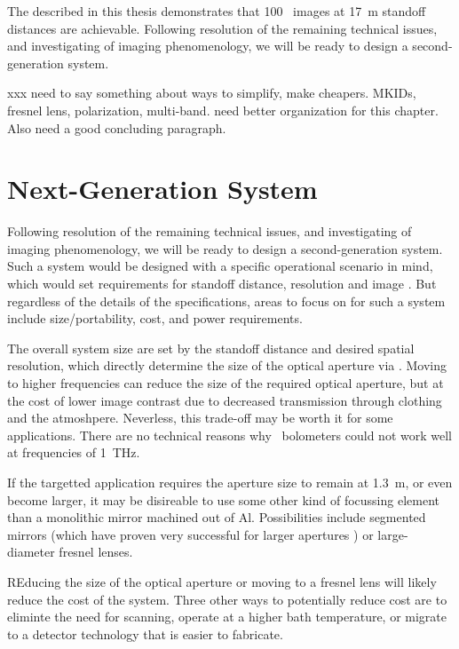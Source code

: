 The \Imager described in this thesis demonstrates that \SI{100}{\mK} \NETD\ images at \SI{17}{\m} standoff distances are achievable.
Following resolution of the remaining technical issues, and investigating of imaging phenomenology, we will be ready to design a second-generation system.

xxx need to say something about ways to simplify, make cheapers. MKIDs, fresnel lens, polarization, multi-band. need better organization for this chapter. Also need a good concluding paragraph.

\section{Next-Generation System}

Following resolution of the remaining technical issues, and investigating of imaging phenomenology, we will be ready to design a second-generation system.
Such a system would be designed with a specific operational scenario in mind, which would set requirements for standoff distance, resolution and image \NETD.
But regardless of the details of the specifications, areas to focus on for such a system include size/portability, cost, and power requirements.

The overall system size are set by the standoff distance and desired spatial resolution, which directly determine the size of the optical aperture via .
Moving to higher frequencies can reduce the size of the required optical aperture, but at the cost of lower image contrast due to decreased transmission through clothing and the atmoshpere.
Neverless, this trade-off may be worth it for some applications.
There are no technical reasons why \TES\ bolometers could not work well at frequencies of \SI{1}{\THz}.

If the targetted application requires the aperture size to remain at \SI{1.3}{\m}, or even become larger, it may be disireable to use some other kind of focussing element than a monolithic mirror machined out of Al.
Possibilities include segmented mirrors (which have proven very successful for larger apertures \cite{stp, act}) or large-diameter fresnel lenses.

REducing the size of the optical aperture or moving to a fresnel lens will likely reduce the cost of the system.
Three other ways to potentially reduce cost are to eliminte the need for scanning, operate at a higher bath temperature, or migrate to a detector technology that is easier to fabricate.

